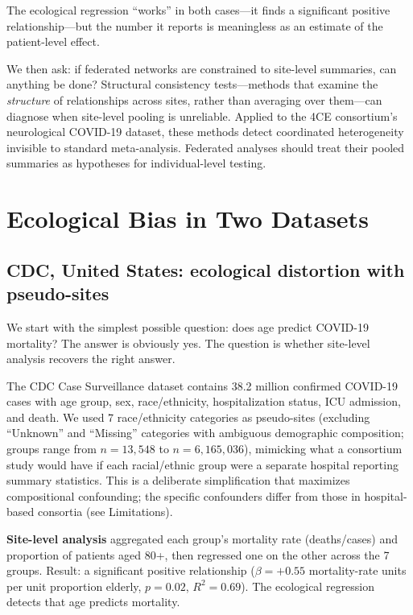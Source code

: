 \documentclass[11pt]{article}
\begin{document}
The ecological regression ``works'' in both cases---it finds a significant
positive relationship---but the number it reports is meaningless as an
estimate of the patient-level effect.

We then ask: if federated networks are constrained to site-level summaries,
can anything be done?  Structural consistency tests---methods
that examine the \emph{structure} of relationships across sites, rather than
averaging over them---can diagnose when site-level pooling is unreliable.
Applied to the 4CE consortium's neurological COVID-19 dataset, these methods
detect coordinated heterogeneity invisible to standard meta-analysis.
Federated analyses should treat their pooled summaries as hypotheses for
individual-level testing.


\section{Ecological Bias in Two Datasets}

\subsection{CDC, United States: ecological distortion with pseudo-sites}

We start with the simplest possible question: does age predict COVID-19
mortality?  The answer is obviously yes.  The question is whether site-level
analysis recovers the right answer.

The CDC Case Surveillance dataset contains 38.2 million confirmed COVID-19
cases with age group, sex, race/ethnicity, hospitalization status, ICU
admission, and death.  We used 7 race/ethnicity categories as pseudo-sites
(excluding ``Unknown'' and ``Missing'' categories with ambiguous demographic
composition; groups range from $n = 13{,}548$ to $n = 6{,}165{,}036$),
mimicking what a consortium study would have if each racial/ethnic group
were a separate hospital reporting summary statistics.  This is a deliberate
simplification that maximizes compositional confounding; the specific
confounders differ from those in hospital-based consortia (see Limitations).

\textbf{Site-level analysis} aggregated each group's mortality rate
(deaths/cases) and proportion of patients aged 80+, then regressed one on the
other across the 7 groups.  Result: a significant positive relationship
($\beta = +0.55$ mortality-rate units per unit proportion elderly,
$p = 0.02$, $R^2 = 0.69$).  The ecological regression detects that age
predicts mortality.
\end{document}
